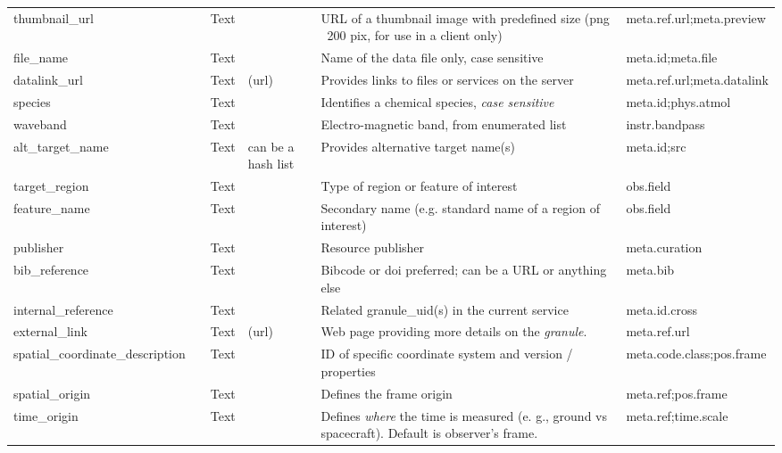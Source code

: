 \documentclass[11pt,a4paper]{ivoa}
\begin{document}
\begin{longtable}{p{3.5cm}p{0.5cm}p{1cm}p{1cm}p{7cm}p{3cm}}
thumbnail\_url&&Text&&URL of a thumbnail image with predefined size (png ~200 pix, for use in a client only)&meta.ref.url;meta.preview\\

file\_name&&Text&&Name of the data file only, case sensitive&meta.id;meta.file\\

datalink\_url&&Text&(url)&Provides links to files or services on the server&meta.ref.url;meta.datalink\\

species&&Text&&Identifies a chemical species, \emph{case sensitive}&meta.id;phys.atmol\\

waveband&&Text&&Electro-magnetic band, from enumerated list&instr.bandpass\\

alt\_target\_name&&Text&can be a hash list&Provides alternative target name(s)&meta.id;src\\

target\_region&&Text&&Type of region or feature of interest&obs.field\\

feature\_name&&Text&&Secondary name (e.g. standard name of a region of interest)&obs.field \\

publisher&&Text&&Resource publisher&meta.curation\\

bib\_reference&&Text&&Bibcode or doi preferred; can be a URL or anything else&meta.bib\\

internal\_reference&&Text&&Related granule\_uid(s) in the current service&meta.id.cross\\

external\_link&&Text&(url)&Web page providing more details on the \emph{granule}.&meta.ref.url\\

spatial\_coordinate\_description&&Text&&ID of specific coordinate system and version / properties&meta.code.class;pos.frame\\

spatial\_origin&&Text&&Defines the frame origin&meta.ref;pos.frame\\

time\_origin&&Text&&Defines \emph{where} the time is measured (e. g., ground vs spacecraft). Default is observer's frame.&meta.ref;time.scale\\


\end{longtable}
\end{document}
